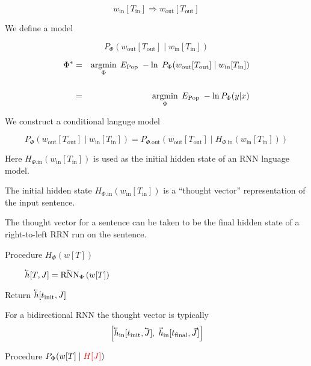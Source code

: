 {%

$$w_{\mathrm{in}}[T_{\mathrm{in}}] \Rightarrow w_{\mathrm{out}}[T_{\mathrm{out}}]$$

\vfill
We define a model

\vfill
$$P_\Phi\left(w_{\mathrm{out}}[T_{\mathrm{out}}]\;|\; w_{\mathrm{in}}[T_\mathrm{in}]\right)$$

\vfill
\begin{eqnarray*}
\Phi^*  & = & \operatorname*{argmin}_\Phi\; E_{\mathrm{Pop}} \;-\ln\;P_\Phi(w_{\mathrm{out}}[T_{\mathrm{out}}] \;|\; w_{\mathrm{in}}[T_{\mathrm{in}}]) \\
\\
& = & \operatorname*{argmin}_\Phi \; E_{\mathrm{Pop}} \; -\ln P_\Phi(y|x)
\end{eqnarray*}



\vfill
We construct a conditional languge model

$$P_\Phi(w_{\mathrm{out}}[T_{\mathrm{out}}]\; | \; w_{\mathrm{in}}[T_{\mathrm{in}}]) = P_{\Phi.\mathrm{out}}(w_{\mathrm{out}}[T_{\mathrm{out}}] \;|\; H_{\Phi.\mathrm{in}}(w_{\mathrm{in}}[T_{\mathrm{in}}]))$$

\vfill
Here $H_{\Phi.\mathrm{in}}(w_{\mathrm{in}}[T_{\mathrm{in}}])$ is used as the initial hidden state of an RNN lnguage model.

\vfill
The initial hidden state $H_{\Phi.\mathrm{in}}(w_{\mathrm{in}}[T_{\mathrm{in}}])$ is a ``thought vector'' representation of the input sentence.


The thought vector for a sentence can be taken to be the final hidden state of a right-to-left RRN run on the sentence.

\vfill
Procedure $H_\Phi(w[T])$

\bigskip
$~\hspace{2em}\cev{h}[T,J] = \cev{\mathrm{RNN}}_\Phi\left(w[T]\right)$

\bigskip
Return $\cev{h}[t_{\mathrm{init}},J]$

\vfill
For a bidirectional RNN the thought vector is typically
\bigskip
$$\left[\cev{h}_{\mathrm{in}}[t_{\mathrm{init}},\cev{J}],\;\vec{h}_{\mathrm{in}}[t_{\mathrm{final}},\vec{J}]\right]$$


Procedure $P_\Phi(w[T] \;|\; {\color{red} H[J]})$

}
